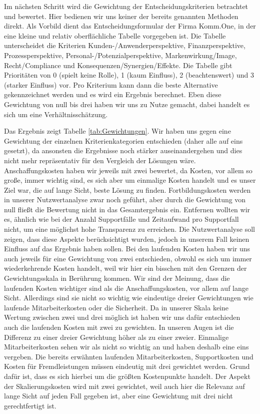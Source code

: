 Im nächsten Schritt wird die Gewichtung der Entscheidungskriterien betrachtet und bewertet. Hier bedienen wir uns keiner der bereits genannten Methoden direkt. Als Vorbild dient das Entscheidungsformular der Firma Komm.One, in der eine kleine und relativ oberflächliche Tabelle vorgegeben ist. Die Tabelle unterscheidet die Kriterien Kunden-/Anwenderperspektive, Finanzperspektive, Prozessperspektive, Personal-/Potenzialperspektive, Markenwirkung/Image, Recht/Compliance und Konsequenzen/Synergien/Effekte. Die Tabelle gibt Prioritäten von 0 (spielt keine Rolle), 1 (kaum Einfluss), 2 (beachtenswert) und 3 (starker Einfluss) vor. Pro Kriterium kann dann die beste Alternative gekennzeichnet werden und es wird ein Ergebnis berechnet. Eben diese Gewichtung von null bis drei haben wir uns zu Nutze gemacht, dabei handelt es sich um eine Verhältnisschätzung.

Das Ergebnis zeigt Tabelle \ref{tab:Gewichtungen}. Wir haben uns gegen eine Gewichtung der einzelnen Kriterienkategorien entschieden (daher alle auf eins gesetzt), da ansonsten die Ergebnisse noch stärker auseinandergehen und dies nicht mehr repräsentativ für den Vergleich der Lösungen wäre. Anschaffungskosten haben wir jeweils mit zwei bewertet, da Kosten, vor allem so große, immer wichtig sind, es sich aber um einmalige Kosten handelt und es unser Ziel war, die auf lange Sicht, beste Lösung zu finden. Fortbildungskosten werden in unserer Nutzwertanalyse zwar noch geführt, aber durch die Gewichtung von null fließt die Bewertung nicht in das Gesamtergebnis ein. Entfernen wollten wir es, ähnlich wie bei der Anzahl Supportfälle und Zeitaufwand pro Supportfall nicht, um eine möglichst hohe Transparenz zu erreichen. Die Nutzwertanalyse soll zeigen, dass diese Aspekte berücksichtigt wurden, jedoch in unserem Fall keinen Einfluss auf das Ergebnis haben sollen. Bei den laufenden Kosten haben wir uns auch jeweils für eine Gewichtung von zwei entschieden, obwohl es sich um immer wiederkehrende Kosten handelt, weil wir hier ein bisschen mit den Grenzen der Gewichtungsskala in Berührung kommen. Wir sind der Meinung, dass die laufenden Kosten wichtiger sind als die Anschaffungskosten, vor allem auf lange Sicht. Allerdings sind sie nicht so wichtig wie eindeutige dreier Gewichtungen wie laufende Mitarbeiterkosten oder die Sicherheit. Da in unserer Skala keine Wertung zwischen zwei und drei möglich ist haben wir uns dafür entschieden auch die laufenden Kosten mit zwei zu gewichten. In unseren Augen ist die Differenz zu einer dreier Gewichtung höher als zu einer zweier. Einmalige Mitarbeiterkosten sehen wir als nicht so wichtig an und haben deshalb eine eins vergeben. Die bereits erwähnten laufenden Mitarbeiterkosten, Supportkosten und Kosten für Fremdleistungen müssen eindeutig mit drei gewichtet werden. Grund dafür ist, dass es sich hierbei um die größten Kostenpunkte handelt. Der Aspekt der Skalierungskosten wird mit zwei gewichtet, weil auch hier die Relevanz auf lange Sicht auf jeden Fall gegeben ist, aber eine Gewichtung mit drei nicht gerechtfertigt ist.

